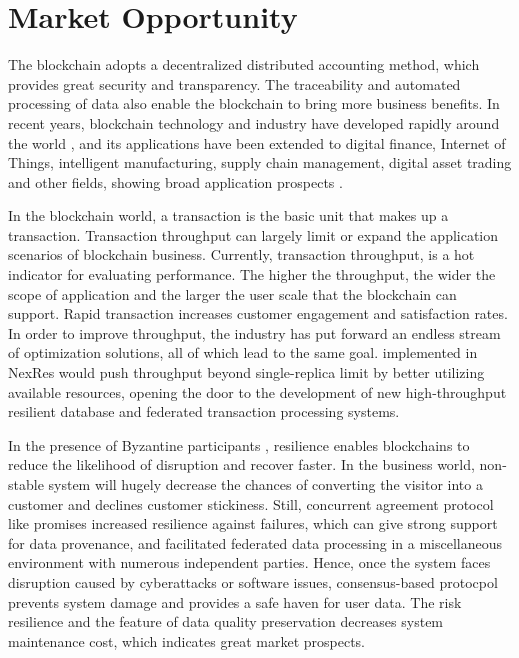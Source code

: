 \section{Market Opportunity}
\par The blockchain adopts a decentralized distributed accounting method, which provides great security 
and transparency. The traceability and automated processing of data also enable the blockchain to 
bring more business benefits. In recent years, blockchain technology and industry have developed 
rapidly around the world \cite{bitcoin, ethereum, hotstuff}, and its applications have been extended 
to digital finance, Internet of Things, intelligent manufacturing, supply chain management, digital 
asset trading and other fields, showing broad application prospects \cite{gupta2021fault}.

\par In the blockchain world, a transaction is the basic unit that makes up a transaction. Transaction 
throughput can largely limit or expand the application scenarios of blockchain business. Currently, 
transaction throughput, is a hot indicator for evaluating performance. The higher the throughput, 
the wider the scope of application and the larger the user scale that the blockchain can support. 
Rapid transaction increases customer engagement and satisfaction rates. In order to improve throughput, 
the industry has put forward an endless stream of optimization solutions, all of which lead to the same 
goal. \RCC{} \cite{rcc} implemented in NexRes would push throughput beyond single-replica limit by better 
utilizing available resources, opening the door to the development of new high-throughput resilient 
database and federated transaction processing systems.

\par In the presence of Byzantine participants \cite{lao2020survey}, resilience enables blockchains to 
reduce the likelihood of disruption and recover faster. In the business 
world, non-stable system will hugely decrease the chances of converting the visitor into a customer 
and declines customer stickiness. Still, concurrent agreement protocol like \RCC{} promises increased 
resilience against failures, which can give strong support for data provenance, and facilitated federated 
data processing in a miscellaneous environment with numerous independent parties. Hence, once the system 
faces disruption caused by cyberattacks or software issues, consensus-based protocpol prevents system damage 
and provides a safe haven for user data. The risk resilience and the feature of data quality preservation 
decreases system maintenance cost, which indicates great market prospects.
